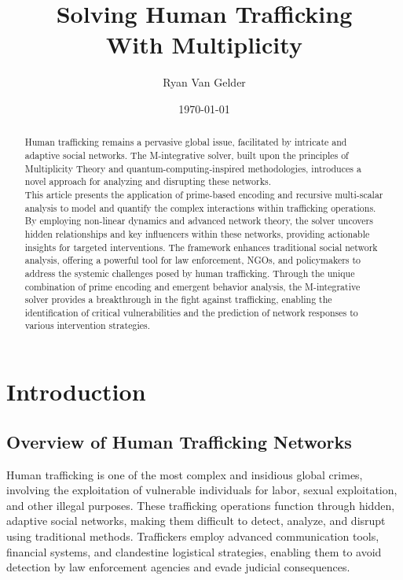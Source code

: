 \documentclass[%
 preprint, linenumbers,
 amsmath,amssymb,
 aps, physrev,
]{revtex4-2}
\begin{document}

\title{\textbf{Solving Human Trafficking \\ With Multiplicity} 
}%


\author{Ryan Van Gelder}
%

\date{\today}%

\begin{abstract}
Human trafficking remains a pervasive global issue, facilitated by intricate and adaptive social networks. The M-integrative solver, built upon the principles of Multiplicity Theory and quantum-computing-inspired methodologies, introduces a novel approach for analyzing and disrupting these networks.\\ This article presents the application of prime-based encoding and recursive multi-scalar analysis to model and quantify the complex interactions within trafficking operations. By employing non-linear dynamics and advanced network theory, the solver uncovers hidden relationships and key influencers within these networks, providing actionable insights for targeted interventions. The framework enhances traditional social network analysis, offering a powerful tool for law enforcement, NGOs, and policymakers to address the systemic challenges posed by human trafficking. Through the unique combination of prime encoding and emergent behavior analysis, the M-integrative solver provides a breakthrough in the fight against trafficking, enabling the identification of critical vulnerabilities and the prediction of network responses to various intervention strategies.
\end{abstract}

\maketitle
\tableofcontents

\section{Introduction}
\subsection{Overview of Human Trafficking Networks}
Human trafficking is one of the most complex and insidious global crimes, involving the exploitation of vulnerable individuals for labor, sexual exploitation, and other illegal purposes. These trafficking operations function through hidden, adaptive social networks, making them difficult to detect, analyze, and disrupt using traditional methods. Traffickers employ advanced communication tools, financial systems, and clandestine logistical strategies, enabling them to avoid detection by law enforcement agencies and evade judicial consequences.
\end{document}
